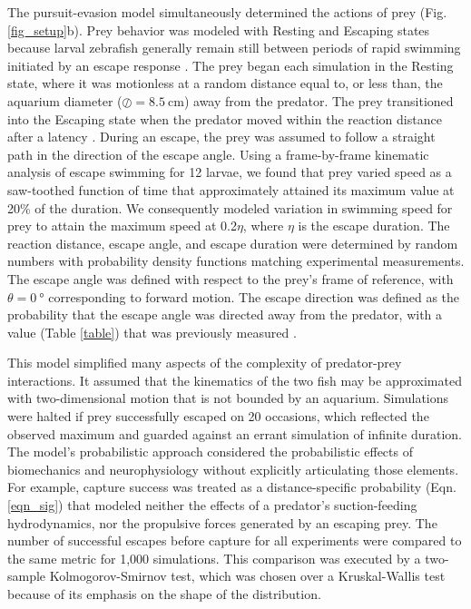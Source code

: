 \documentclass[]{rsos}%
\begin{document}
The pursuit-evasion model simultaneously determined the actions of prey (Fig. \ref{fig_setup}b).
Prey behavior was modeled with Resting and Escaping states because larval zebrafish generally remain still between periods of rapid swimming initiated by an escape response \cite{Stewart:2013bha, Stewart:2014cma}. 
The prey began each simulation in the Resting state, where it was motionless at a random distance equal to, or less than, the aquarium diameter ($\oslash = \SI{8.5}{\cm}$) away from the predator.
The prey transitioned into the Escaping state when the predator moved within the reaction distance after a latency \cite{Nair:2015gk}.
During an escape, the prey was assumed to follow a straight path in the direction of the escape angle.
Using a frame-by-frame kinematic analysis of escape swimming for 12 larvae, we found that prey varied speed as a saw-toothed function of time that approximately attained its maximum value at 20\% of the duration. 
We consequently modeled variation in swimming speed for prey to attain the maximum speed at 0.2$\eta$, where $\eta$ is the escape duration. 
The reaction distance, escape angle, and escape duration were determined by random numbers with probability density functions matching experimental measurements.
The escape angle was defined with respect to the prey's frame of reference, with $\theta =  \SI{0}{\degree}$ corresponding to forward motion.
The  escape direction was defined as the probability that the escape angle was directed away from the predator, with a value (Table \ref{table}) that was previously measured \cite{Stewart:2014cma}.

This model simplified many aspects of the complexity of predator-prey interactions.
It assumed that the kinematics of the two fish may be approximated with two-dimensional motion that is not bounded by an aquarium. 
Simulations were halted if prey successfully escaped on 20 occasions, which reflected the observed maximum and guarded against an errant simulation of infinite duration.
The model's probabilistic approach considered the probabilistic effects of biomechanics and neurophysiology without explicitly articulating those elements.
For example, capture success was treated as a distance-specific probability (Eqn. \ref{eqn_sig}) that modeled neither the effects of a predator's suction-feeding hydrodynamics, nor the propulsive forces generated by an escaping prey.
The number of successful escapes before capture for all experiments were compared to the same metric for 1,000 simulations.  
This comparison was executed by a two-sample Kolmogorov-Smirnov test, which was chosen over a Kruskal-Wallis test because of its emphasis on the shape of the distribution.  
\end{document}
